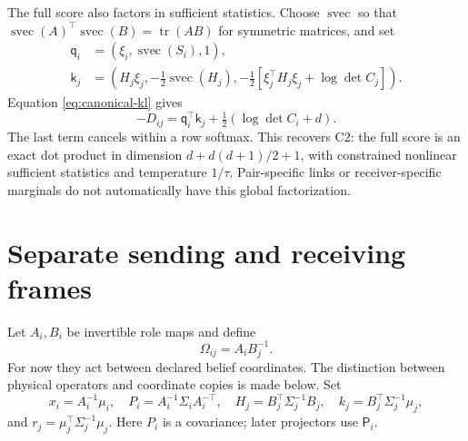 \documentclass[11pt,letterpaper]{article}
\newcommand{\tr}{\operatorname{tr}}
\newcommand{\svec}{\operatorname{svec}}
\theoremstyle{remark}
\begin{document}
The full score also factors in sufficient statistics. Choose $\svec$ so that $\svec(A)^\top\svec(B)=\tr(AB)$ for symmetric matrices, and set
\begin{align}
 \mathsf q_i&=(\xi_i,\svec(S_i),1),\\
 \mathsf k_j&=\left(H_j\xi_j,-\tfrac12\svec(H_j),
 -\tfrac12[\xi_j^\top H_j\xi_j+\log\det C_j]\right).
\end{align}
Equation \eqref{eq:canonical-kl} gives
\begin{equation}
 -D_{ij}=\mathsf q_i^\top\mathsf k_j+\tfrac12(\log\det C_i+d).
 \label{eq:lift}
\end{equation}
The last term cancels within a row softmax. This recovers C2: the full score is an exact dot product in dimension $d+d(d+1)/2+1$, with constrained nonlinear sufficient statistics and temperature $1/\tau$. Pair-specific links or receiver-specific marginals do not automatically have this global factorization.

\section{Separate sending and receiving frames}
\label{sec:twoframes}
Let $A_i,B_i$ be invertible role maps and define
\begin{equation}
 \Omega_{ij}=A_iB_j^{-1}.
\end{equation}
For now they act between declared belief coordinates. The distinction between physical operators and coordinate copies is made below. Set
\begin{equation}
 x_i=A_i^{-1}\mu_i,\quad P_i=A_i^{-1}\Sigma_iA_i^{-\top},\quad
 H_j=B_j^\top\Sigma_j^{-1}B_j,\quad k_j=B_j^\top\Sigma_j^{-1}\mu_j,
\end{equation}
and $r_j=\mu_j^\top\Sigma_j^{-1}\mu_j$. Here $P_i$ is a covariance; later projectors use $\mathsf P_i$.
\end{document}

